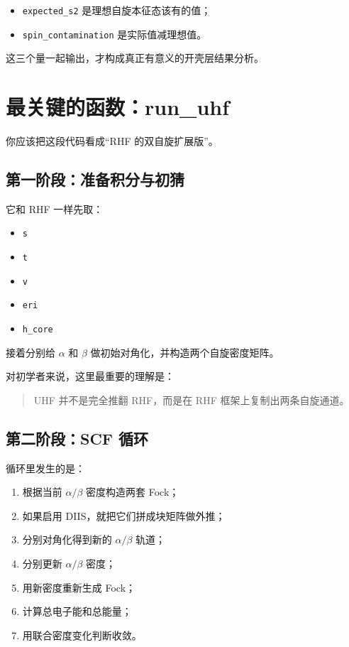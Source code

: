 \documentclass[UTF8,11pt,fontset=fandol]{ctexbook}
\begin{document}
\begin{itemize}
  \item \texttt{expected\_s2} 是理想自旋本征态该有的值；
  \item \texttt{spin\_contamination} 是实际值减理想值。
\end{itemize}

这三个量一起输出，才构成真正有意义的开壳层结果分析。

\section{最关键的函数：run\_uhf}



你应该把这段代码看成“RHF 的双自旋扩展版”。

\subsection*{第一阶段：准备积分与初猜}

它和 RHF 一样先取：
\begin{itemize}
  \item \texttt{s}
  \item \texttt{t}
  \item \texttt{v}
  \item \texttt{eri}
  \item \texttt{h\_core}
\end{itemize}

接着分别给 $\alpha$ 和 $\beta$ 做初始对角化，并构造两个自旋密度矩阵。

对初学者来说，这里最重要的理解是：

\begin{quote}
UHF 并不是完全推翻 RHF，而是在 RHF 框架上复制出两条自旋通道。
\end{quote}

\subsection*{第二阶段：SCF 循环}

循环里发生的是：
\begin{enumerate}[label=\arabic*.]
  \item 根据当前 $\alpha/\beta$ 密度构造两套 Fock；
  \item 如果启用 DIIS，就把它们拼成块矩阵做外推；
  \item 分别对角化得到新的 $\alpha/\beta$ 轨道；
  \item 分别更新 $\alpha/\beta$ 密度；
  \item 用新密度重新生成 Fock；
  \item 计算总电子能和总能量；
  \item 用联合密度变化判断收敛。
\end{enumerate}
\end{document}
